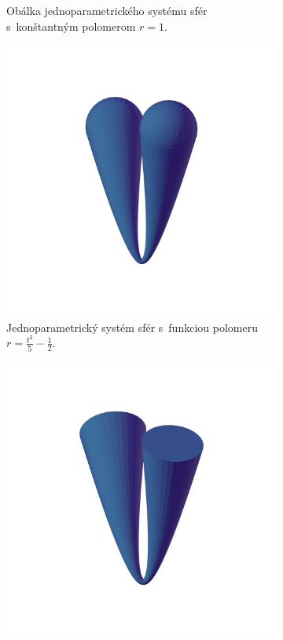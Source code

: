 \documentclass[12pt, twoside]{book}
\begin{document}
\begin{figure}[h]
\begin{subfigure}[t]{0.49\textwidth}
		\caption{Obálka jednoparametrického systému sfér s~konštantným polomerom $r=1$.}
        \label{fig:plocha2}
    \end{subfigure}
    \hfill
    \begin{subfigure}[t]{0.49\textwidth}
        \centering
        \includegraphics[width=\textwidth, trim=0mm 50mm 0mm 100mm, clip=true]{images/bienert_function_radius_spheres.png}
        	\caption{Jednoparametrický systém sfér s~funkciou polomeru $r=\frac{t^2}{5}-\frac{1}{2}$.}
        \label{fig:plocha3}
    \end{subfigure}
    \hfill
    \begin{subfigure}[t]{0.49\textwidth}
        \centering
        \includegraphics[width=\textwidth, trim=0mm 50mm 0mm 50mm, clip=true]{images/bienert_function_radius_envelope.png}

\end{subfigure}
\end{figure}
\end{document}
